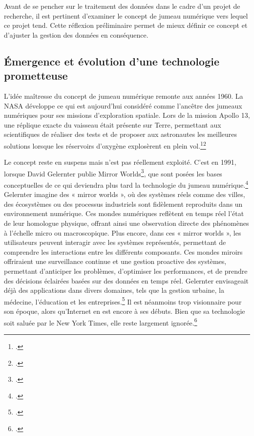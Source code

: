 Avant de se pencher sur le traitement des données dans le cadre d'un projet de recherche, il est pertinent d'examiner le concept de jumeau numérique vers lequel ce projet tend. Cette réflexion préliminaire permet de mieux définir ce concept et d'ajuster la gestion des données en conséquence.


        \subsection{Émergence et évolution d’une technologie prometteuse}

L’idée maîtresse du concept de jumeau numérique remonte aux années 1960. La NASA développe ce qui est aujourd'hui considéré comme l'ancêtre des jumeaux numériques pour ses missions d'exploration spatiale. Lors de la mission Apollo 13, une réplique exacte du vaisseau était présente sur Terre, permettant aux scientifiques de réaliser des tests et de proposer aux astronautes les meilleures solutions lorsque les réservoirs d'oxygène explosèrent en plein vol.\footcite{QuEstceQu2023}\footcite{miskinisMysteriousHistoryDigital2019}

Le concept reste en suspens mais n'est pas réellement exploité. C'est en 1991, lorsque David Gelernter publie Mirror Worlds\footcite{gelernterMirrorWorldsDay1991}, que sont posées les bases conceptuelles de ce qui deviendra plus tard la technologie du jumeau numérique.\footcite{kalilMirrorWorldsBook2024} Gelernter imagine des « mirror worlds », où des systèmes réels comme des villes, des écosystèmes ou des processus industriels sont fidèlement reproduits dans un environnement numérique. Ces mondes numériques reflètent en temps réel l'état de leur homologue physique, offrant ainsi une observation directe des phénomènes à l’échelle micro ou macroscopique. Plus encore, dans ces « mirror worlds », les utilisateurs peuvent interagir avec les systèmes représentés, permettant de comprendre les interactions entre les différents composants. Ces mondes miroirs offriraient une surveillance continue et une gestion proactive des systèmes, permettant d’anticiper les problèmes, d’optimiser les performances, et de prendre des décisions éclairées basées sur des données en temps réel. Gelernter envisageait déjà des applications dans divers domaines, tels que la gestion urbaine, la médecine, l'éducation et les entreprises.\footcite{zadehDigitalTwinMight2024}  Il est néanmoins trop visionnaire pour son époque, alors qu'Internet en est encore à ses débuts. Bien que sa technologie soit saluée par le New York Times, elle reste largement ignorée.\footcite{lehmann-hauptBooksTimesMirror1991}\\

